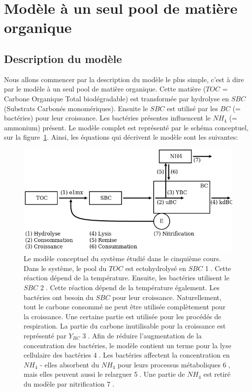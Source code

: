 \section{Mod\`ele \`a un seul pool de matière organique}
\subsection{Description du mod\`ele}

\par{
Nous allons commencer par la description du modèle le plus simple, c'est \`a dire par le mod\`ele \`a un seul pool de matière organique. Cette matière ($TOC$ = Carbone Organique Total biodégradable)
est transformée par hydrolyse en $SBC$ (Substrats Carbonés monomériques). Ensuite le $SBC$ est
utilisé par les $BC$ (= bactéries) pour leur croissance. Les bactéries pr\'esentes influencent le $NH_4$
(= ammonium) présent. Le modèle complet est représenté par le schéma conceptuel, sur la figure~\ref{fig:partie1concModel}. Ainsi, les équations qui d\'ecrivent le modèle sont les suivantes:
}

\begin{figure}[h!]
  \includegraphics[width=\textwidth]{partie1/scan1.jpg}
  \caption{Le modèle conceptuel du système étudié dans le cinquième cours. Dans le système, le pool du
$TOC$ est ectohydrolys\'e en $SBC$ \textcircled{1}. Cette réaction dépend de la température. Ensuite, 
les bactéries utilisent le $SBC$ \textcircled{2}. Cette réaction dépend de la température également. Les
bactéries ont besoin du $SBC$ pour leur croissance. Naturellement, tout le carbone consomm\'e ne peut  être
utilisée compl\`etement pour la croissance. Une certaine partie est utilis\'ee pour les procédés de
respiration. La partie du carbone inutilisable pour la croissance est représenté par $Y_{BC}$ \textcircled{3}.
Afin de réduire l'augmentation de la concentration des bactéries, le modèle contient un terme pour la lyse
cellulaire des bactéries \textcircled{4}. Les bactéries affectent la concentration en $NH_4$ -
elles absorbent du $NH_4$ pour leurs processus métaboliques \textcircled{6}, mais elles peuvent aussi le
relarguer \textcircled{5}. Une partie de $NH_4$ est retiré du modèle par nitrification \textcircled{7}.
}
  \label{fig:partie1concModel}
\end{figure}

